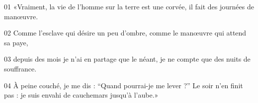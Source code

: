 01 «Vraiment, la vie de l’homme sur la terre est une corvée, il fait des journées de manœuvre.

02 Comme l’esclave qui désire un peu d’ombre, comme le manœuvre qui attend sa paye,

03 depuis des mois je n’ai en partage que le néant, je ne compte que des nuits de souffrance.

04 À peine couché, je me dis : “Quand pourrai-je me lever ?” Le soir n’en finit pas : je suis envahi de cauchemars jusqu’à l’aube.»
